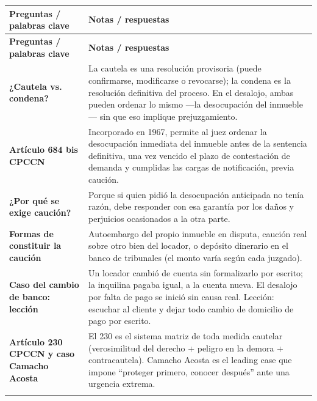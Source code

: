 \documentclass[12pt,oneside]{book}
\begin{document}
\begin{longtable}{
    >{\RaggedRight\arraybackslash}p{}
    >{\RaggedRight\arraybackslash}p{}
}
\toprule
\textbf{Preguntas / palabras clave} & \textbf{Notas / respuestas} \\
\midrule
\endfirsthead
\toprule
\textbf{Preguntas / palabras clave} & \textbf{Notas / respuestas} \\
\midrule
\endhead

\textbf{¿Cautela vs. condena?} &
La cautela es una resolución provisoria (puede confirmarse, modificarse o revocarse); la condena es la resolución definitiva del proceso. En el desalojo, ambas pueden ordenar lo mismo ---la desocupación del inmueble--- sin que eso implique prejuzgamiento. \\
\addlinespace
\cmidrule{1-2}

\textbf{Artículo 684 bis CPCCN} &
Incorporado en 1967, permite al juez ordenar la desocupación inmediata del inmueble antes de la sentencia definitiva, una vez vencido el plazo de contestación de demanda y cumplidas las cargas de notificación, previa caución. \\
\addlinespace
\cmidrule{1-2}

\textbf{¿Por qué se exige caución?} &
Porque si quien pidió la desocupación anticipada no tenía razón, debe responder con esa garantía por los daños y perjuicios ocasionados a la otra parte. \\
\addlinespace
\cmidrule{1-2}

\textbf{Formas de constituir la caución} &
Autoembargo del propio inmueble en disputa, caución real sobre otro bien del locador, o depósito dinerario en el banco de tribunales (el monto varía según cada juzgado). \\
\addlinespace
\cmidrule{1-2}

\textbf{Caso del cambio de banco: lección} &
Un locador cambió de cuenta sin formalizarlo por escrito; la inquilina pagaba igual, a la cuenta nueva. El desalojo por falta de pago se inició sin causa real. Lección: escuchar al cliente y dejar todo cambio de domicilio de pago por escrito. \\
\addlinespace
\cmidrule{1-2}

\textbf{Artículo 230 CPCCN y caso Camacho Acosta} &
El 230 es el sistema matriz de toda medida cautelar (verosimilitud del derecho + peligro en la demora + contracautela). Camacho Acosta es el leading case que impone ``proteger primero, conocer después'' ante una urgencia extrema. \\
\addlinespace
\cmidrule{1-2}


\end{longtable}
\end{document}
